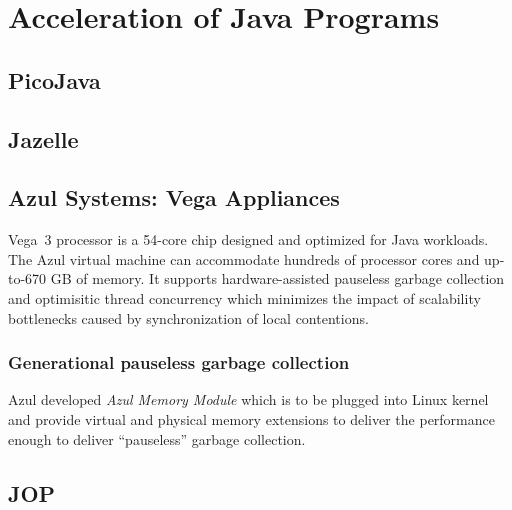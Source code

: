 \chapter{Acceleration of Java Programs}

\section{PicoJava}

\section{Jazelle}

\section{Azul Systems: Vega Appliances}
Vega~3 processor is a 54-core chip designed and optimized for Java
workloads. The Azul virtual machine can accommodate hundreds of processor
cores and up-to-670 GB of memory. It supports hardware-assisted pauseless
garbage collection and optimisitic thread concurrency which minimizes the
impact of scalability bottlenecks caused by synchronization of local
contentions. 


\subsection{Generational pauseless garbage collection}
Azul developed {\em Azul Memory Module\/} which is to be plugged into Linux
kernel and provide virtual and physical memory extensions to deliver the
performance enough to deliver ``pauseless'' garbage collection. 

\section{JOP}



